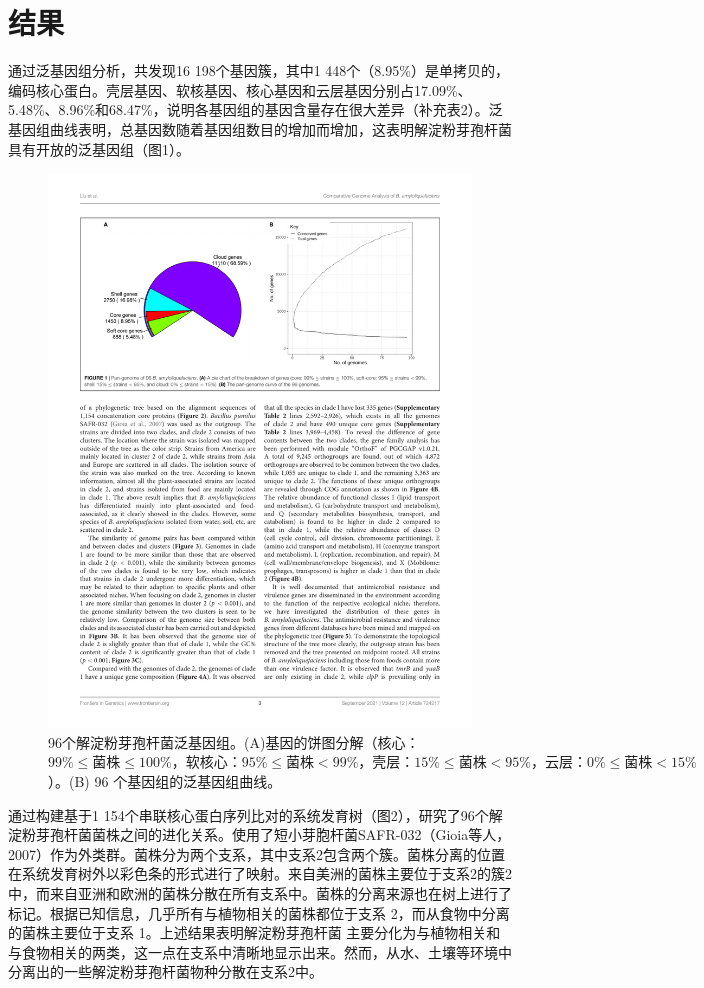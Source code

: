 \documentclass[UTF8]{ctexart}
\begin{document}
\section{结果}
通过泛基因组分析，共发现16 198个基因簇，其中1 448个（8.95\%）是单拷贝的，编码核心蛋白。壳层基因、软核基因、核心基因和云层基因分别占17.09\%、5.48\%、8.96\%和68.47\%，说明各基因组的基因含量存在很大差异（补充表2）。泛基因组曲线表明，总基因数随着基因组数目的增加而增加，这表明解淀粉芽孢杆菌具有开放的泛基因组（图1）。
\begin{figure}[!htb]
    \centering
    \includegraphics[width=\textwidth]{figures/figure1.pdf}
    \caption{96个解淀粉芽孢杆菌泛基因组。(A)基因的饼图分解（核心：$99\% \leq  菌株 \leq100\%，软核心：95\% \leq 菌株 < 99\%，壳层：15\% \leq 菌株 < 95\%，云层：0\% \leq 菌株 < 15\%$）。(B) 96 个基因组的泛基因组曲线。}
\end{figure}


通过构建基于1 154个串联核心蛋白序列比对的系统发育树（图2），研究了96个解淀粉芽孢杆菌菌株之间的进化关系。使用了短小芽胞杆菌SAFR-032（Gioia等人，2007）作为外类群。菌株分为两个支系，其中支系2包含两个簇。菌株分离的位置在系统发育树外以彩色条的形式进行了映射。来自美洲的菌株主要位于支系2的簇2中，而来自亚洲和欧洲的菌株分散在所有支系中。菌株的分离来源也在树上进行了标记。根据已知信息，几乎所有与植物相关的菌株都位于支系 2，而从食物中分离的菌株主要位于支系 1。上述结果表明解淀粉芽孢杆菌 主要分化为与植物相关和与食物相关的两类，这一点在支系中清晰地显示出来。然而，从水、土壤等环境中分离出的一些解淀粉芽孢杆菌物种分散在支系2中。
\end{document}
